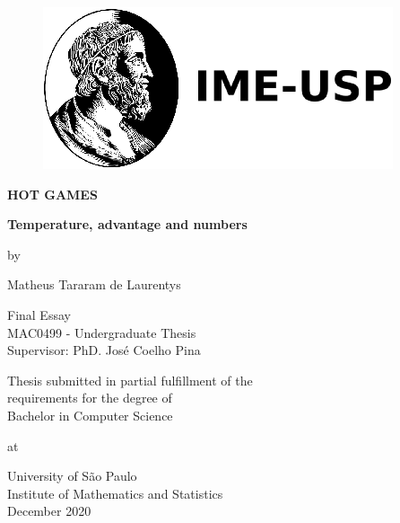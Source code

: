 \begin{titlepage}
\begin{figure}[H]
    \hspace*{-1.0cm}
    \vspace*{-0.5cm}
    \includegraphics[scale=0.4]{images/logo_ime.png}\\
\end{figure}

\begin{center}
    \vspace*{2cm}
    
    {\LARGE \textbf{HOT GAMES}}
    
    \vspace{0.5cm}
    \textbf{Temperature, advantage and numbers}
    
	\vspace{1cm}
	 by
    \vspace{1cm}
    
   Matheus Tararam de Laurentys
\end{center}

\vspace{1cm}

\begin{center}   
	{\large Final Essay \\ 
		MAC0499 - Undergraduate Thesis} \\
	\vspace{0.5cm}
	Supervisor: PhD. José Coelho Pina \\
	
\end{center}

\vspace{1cm}

\begin{center}
	Thesis submitted in partial fulfillment of the\\
	requirements for the degree of\\
	Bachelor in Computer Science

	\vspace{1.0cm}
	at
	\vspace{1cm}
	
	University of São Paulo \\
	Institute of Mathematics and Statistics \\
	December 2020
\end{center}

\end{titlepage}